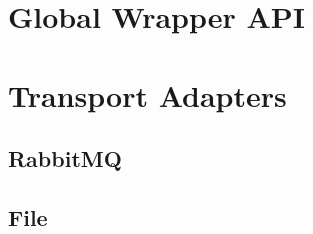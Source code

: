 \documentclass[paper=letter]{scrreport}
\begin{document}

\chapter{Global Wrapper API}


\chapter{Transport Adapters}


\section{RabbitMQ}



\section{File}


\end{document}
